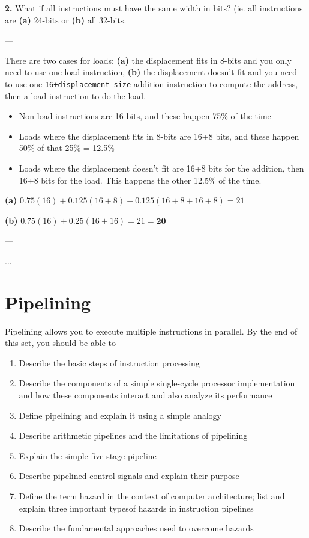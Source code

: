 \documentclass{article}
\begin{document}
\textbf{2. }What if all instructions must have the same width in bits? (ie. all instructions are \textbf{(a)} 24-bits or \textbf{(b)} all 32-bits. 

---

There are two cases for loads: \textbf{(a)} the displacement fits in 8-bits and you only need to use one load instruction, \textbf{(b)} the displacement doesn't fit and you need to use one \texttt{16+displacement size} addition instruction to compute the address, then a load instruction to do the load.

\begin{itemize}
\item Non-load instructions are 16-bits, and these happen 75\% of the time
\item Loads where the displacement fits in 8-bits are 16+8 bits, and these happen 50\% of that 25\% = 12.5\%
\item Loads where the displacement doesn't fit are 16+8 bits for the addition, then 16+8 bits for the load. This happens the other 12.5\% of the time. 
\end{itemize}


\textbf{(a)} $0.75(16) + 0.125(16+8) + 0.125(16+8+16+8) = 21$

\textbf{(b)} $0.75(16) + 0.25(16+16) = 21 = \textbf{20}$


---

...

\section{Pipelining}

Pipelining allows you to execute multiple instructions in parallel. By the end of this set, you should be able to

\begin{enumerate}
\item Describe the basic steps of instruction processing

\item Describe the components of a simple single-cycle processor implementation and how these components interact and also analyze its performance

\item Define pipelining and explain it using a simple analogy 

\item Describe arithmetic pipelines and the limitations of pipelining

\item Explain the simple five stage pipeline

\item Describe pipelined control signals and explain their purpose

\item Define the term hazard in the context of computer architecture; list and explain three important typesof hazards in instruction pipelines

\item Describe the fundamental approaches used to overcome hazards

\end{enumerate}
\end{document}
